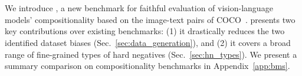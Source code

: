 \section{\method}

We introduce \method, a new benchmark for faithful evaluation of vision-language models' compositionality based on the image-text pairs of COCO~\cite{lin2014microsoft}.
\method presents two key contributions over existing benchmarks: (1) it drastically reduces the two identified dataset biases (Sec.~\ref{sec:data_generation}), and (2) it covers a broad range of fine-grained types of hard negatives (Sec.~\ref{sec:hn_types}). We present a summary comparison on compositionality benchmarks in Appendix~\ref{app:bms}.


